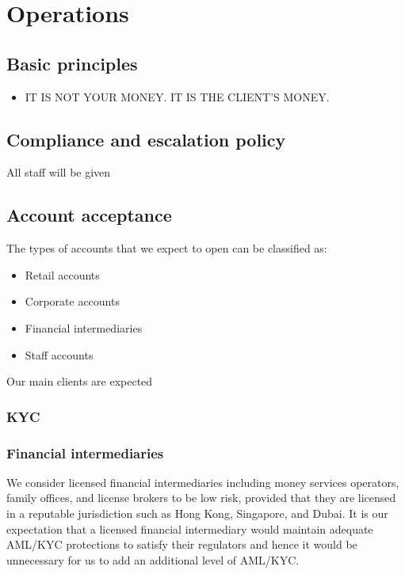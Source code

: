 \chapter{Operations}

\section{Basic principles}

\begin{itemize}
\item IT IS NOT YOUR MONEY.  IT IS THE CLIENT'S MONEY.
\end{itemize}

\section{Compliance and escalation policy}

All staff will be given 

\section{Account acceptance}

The types of accounts that we expect to open can be classified as:

\begin{itemize}
\item Retail accounts
  \item Corporate accounts
\item Financial intermediaries
\item Staff accounts
  \end{itemize}

Our main clients are expected

\subsection{KYC}

\subsection{Financial intermediaries}
We consider licensed financial intermediaries including money services
operators, family offices, and license brokers to be low risk,
provided that they are licensed in a reputable jurisdiction such as
Hong Kong, Singapore, and Dubai.  It is our expectation that a
licensed financial intermediary would maintain adequate AML/KYC
protections to satisfy their regulators and hence it would be
unnecessary for us to add an additional level of AML/KYC.

